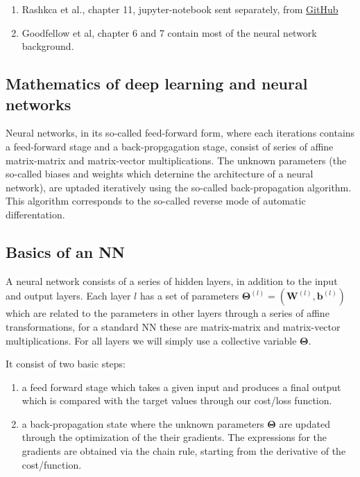 \documentclass[%
oneside,                 %
final,                   %
10pt]{article}
\begin{document}
\begin{enumerate}
\item Rashkca et al., chapter 11, jupyter-notebook sent separately, from \href{{https://github.com/rasbt/machine-learning-book}}{GitHub}

\item Goodfellow et al, chapter 6 and 7 contain most of the neural network background.
\end{enumerate}

\noindent
\subsection{Mathematics of deep learning and neural networks}

Neural networks, in its so-called feed-forward form, where each
iterations contains a feed-forward stage and a back-propgagation
stage, consist of series of affine matrix-matrix and matrix-vector
multiplications. The unknown parameters (the so-called biases and
weights which deternine the architecture of a neural network), are
uptaded iteratively using the so-called back-propagation algorithm.
This algorithm corresponds to the so-called reverse mode of 
automatic differentation. 

\subsection{Basics of an NN}

A neural network consists of a series of hidden layers, in addition to
the input and output layers.  Each layer $l$ has a set of parameters
$\bm{\Theta}^{(l)}=(\bm{W}^{(l)},\bm{b}^{(l)})$ which are related to the
parameters in other layers through a series of affine transformations,
for a standard NN these are matrix-matrix and matrix-vector
multiplications.  For all layers we will simply use a collective variable $\bm{\Theta}$.

It consist of two basic steps:
\begin{enumerate}
\item a feed forward stage which takes a given input and produces a final output which is compared with the target values through our cost/loss function.

\item a back-propagation state where the unknown parameters $\bm{\Theta}$ are updated through the optimization of the their gradients. The expressions for the gradients are obtained via the chain rule, starting from the derivative of the cost/function.
\end{enumerate}
\end{document}
